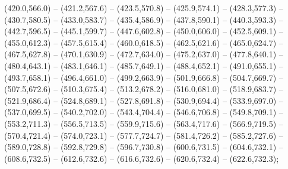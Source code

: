  (420.0,566.0) -- (421.2,567.6) -- (423.5,570.8) -- (425.9,574.1) -- (428.3,577.3) -- (430.7,580.5) -- (433.0,583.7) -- (435.4,586.9) -- (437.8,590.1) -- (440.3,593.3) -- (442.7,596.5) -- (445.1,599.7) -- (447.6,602.8) -- (450.0,606.0) -- (452.5,609.1) -- (455.0,612.3) -- (457.5,615.4) -- (460.0,618.5) -- (462.5,621.6) -- (465.0,624.7) -- (467.5,627.8) -- (470.1,630.9) -- (472.7,634.0) -- (475.2,637.0) -- (477.8,640.1) -- (480.4,643.1) -- (483.1,646.1) -- (485.7,649.1) -- (488.4,652.1) -- (491.0,655.1) -- (493.7,658.1) -- (496.4,661.0) -- (499.2,663.9) -- (501.9,666.8) -- (504.7,669.7) -- (507.5,672.6) -- (510.3,675.4) -- (513.2,678.2) -- (516.0,681.0) -- (518.9,683.7) -- (521.9,686.4) -- (524.8,689.1) -- (527.8,691.8) -- (530.9,694.4) -- (533.9,697.0) -- (537.0,699.5) -- (540.2,702.0) -- (543.4,704.4) -- (546.6,706.8) -- (549.8,709.1) -- (553.2,711.3) -- (556.5,713.5) -- (559.9,715.6) -- (563.4,717.6) -- (566.9,719.5) -- (570.4,721.4) -- (574.0,723.1) -- (577.7,724.7) -- (581.4,726.2) -- (585.2,727.6) -- (589.0,728.8) -- (592.8,729.8) -- (596.7,730.8) -- (600.6,731.5) -- (604.6,732.1) -- (608.6,732.5) -- (612.6,732.6) -- (616.6,732.6) -- (620.6,732.4) -- (622.6,732.3);
